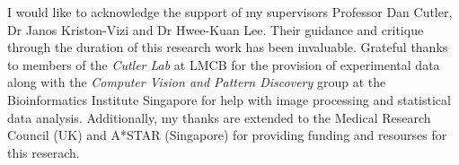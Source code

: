 \begin{acknowledgements}
I would like to acknowledge the support of my supervisors Professor Dan Cutler, Dr Janos Kriston-Vizi and Dr Hwee-Kuan Lee. Their guidance and critique through the duration of this research work has been invaluable. Grateful thanks to members of the \emph{Cutler Lab} at LMCB for the provision of experimental data along with the \emph{Computer Vision and Pattern Discovery} group at the Bioinformatics Institute Singapore for help with image processing and statistical data analysis. Additionally, my thanks are extended to the Medical Research Council (UK) and A*STAR (Singapore) for providing funding and resourses for this reserach.
\end{acknowledgements}

